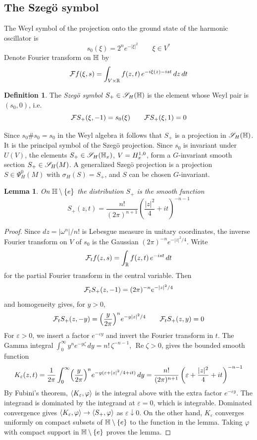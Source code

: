 \documentclass[11pt]{amsart}
\theoremstyle{plain}
\newtheorem{lemma}[theorem]{Lemma}
\theoremstyle{definition}
\newtheorem{definition}[theorem]{Definition}
\theoremstyle{remark}
\begin{document}
\subsection{The Szeg\"o symbol}\label{sec:Szego symbol}

The Weyl symbol of the projection onto the ground state of the harmonic oscillator is
\[ s_0(\xi)=2^n e^{-|\xi|^2}\qquad \xi\in V^*\]
Denote Fourier transform on $\mathbb{H}$ by
\[{\mathcal{F}} f(\xi,s)=\int_{V\times{\mathbb{R}}} f(z,t)\,e^{-i\xi(z)-ist}\,dz\,dt\]



\begin{definition}\label{def:Szego symbol}
The \emph{Szeg\"o symbol} $S_+\in{\mathscr{S}_H}(\mathbb{H})$ is the element whose Weyl pair is
$(s_0,0)$, 
i.e.
\[{\mathcal{F}} S_+(\xi,-1)=s_0(\xi)\qquad {\mathcal{F}} S_+(\xi,1)=0\]
\end{definition}

Since $s_0\#s_0=s_0$ in the Weyl algebra it follows that $S_+$ is a projection in ${\mathscr{S}_H}(\mathbb{H})$.
It is the principal symbol of the Szeg\"o projection.
Since $s_0$ is invariant under $U(V)$, the elements $S_+\in{\mathscr{S}_H}(\mathbb{H}_x)$, $V=H^{1,0}_x$, form a $G$-invariant smooth section $S_+\in{\mathscr{S}_H}(M)$.
A generalized Szeg\"o projection is a projection $S\in\Psi^0_H(M)$ with $\sigma_H(S)=S_+$, and $S$ can be chosen $G$-invariant.



\begin{lemma}\label{lem:Szego kernel}
On $\mathbb{H}\setminus\{e\}$ the distribution $S_+$ is the smooth function
\[ S_+(z,t)=\frac{n!}{(2\pi)^{n+1}}\left(\frac{|z|^2}{4}+it\right)^{-n-1}\]
\end{lemma}
\begin{proof}
Since $dz=|\omega^n|/n!$ is Lebesgue measure in unitary coordinates, the inverse Fourier transform on $V$ of $s_0$ is the Gaussian $(2\pi)^{-n}e^{-|z|^2/4}$.
Write
\[{\mathcal{F}}_tf(z,s)=\int_{\mathbb{R}} f(z,t)\,e^{-is t}\,dt\]
for the partial Fourier transform in the central variable.
Then
\[{\mathcal{F}}_tS_+(z,-1)=(2\pi)^{-n}e^{-|z|^2/4}\]
and homogeneity  gives, for $y>0$,
\[ {\mathcal{F}}_tS_+(z,-y)=\Bigl(\frac{y}{2\pi}\Bigr)^ne^{-y|z|^2/4}\qquad {\mathcal{F}}_tS_+(z,y)=0\]
For $\varepsilon>0$, we insert a factor $e^{-\varepsilon y}$ and invert the Fourier transform in $t$.
The Gamma integral $\int_0^\infty y^ne^{-y\zeta}\,dy=n!\,\zeta^{-n-1}$, $\operatorname{Re}\zeta>0$, gives the bounded smooth function
\[ K_\varepsilon(z,t)=\frac{1}{2\pi}\int_0^\infty\Bigl(\frac{y}{2\pi}\Bigr)^ne^{-y(\varepsilon+|z|^2/4+it)}\,dy=\frac{n!}{(2\pi)^{n+1}}\left(\varepsilon+\frac{|z|^2}{4}+it\right)^{-n-1}\]
By Fubini's theorem, $\langle K_\varepsilon,\varphi \rangle$ is the integral above with the extra factor $e^{-\varepsilon y}$.
The integrand is dominated by the integrand at $\varepsilon=0$, which is integrable.
Dominated convergence gives $\langle K_\varepsilon,\varphi \rangle\to\langle S_+,\varphi \rangle$ as $\varepsilon\downarrow0$.
On the other hand, $K_\varepsilon$ converges uniformly on compact subsets of $\mathbb{H}\setminus\{e\}$ to the function in the lemma.
Taking $\varphi$ with compact support in $\mathbb{H}\setminus\{e\}$ proves the lemma.

\end{proof}
\end{document}
